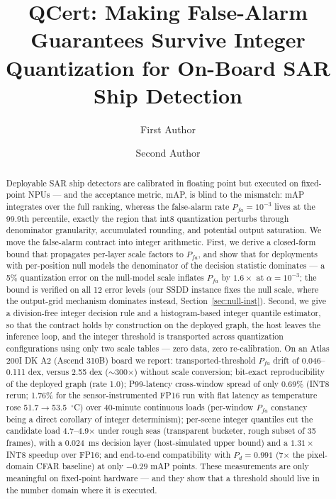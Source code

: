 \documentclass[preprint,12pt]{elsarticle}
\newcommand{\Pfa}{P_{fa}}
\begin{document}
\begin{frontmatter}

\title{QCert: Making False-Alarm Guarantees Survive Integer Quantization for On-Board SAR Ship Detection}

\author[inst1]{First Author}
\author[inst1]{Second Author}

\begin{abstract}
Deployable SAR ship detectors are calibrated in floating point but executed on fixed-point NPUs --- and the acceptance metric, mAP, is blind to the mismatch: mAP integrates over the full ranking, whereas the false-alarm rate $\Pfa=10^{-3}$ lives at the 99.9th percentile, exactly the region that int8 quantization perturbs through denominator granularity, accumulated rounding, and potential output saturation.
We move the false-alarm contract into integer arithmetic.
First, we derive a closed-form bound that propagates per-layer scale factors to $\Pfa$, and show that for deployments with per-position null models the denominator of the decision statistic dominates --- a 5\% quantization error on the null-model scale inflates $\Pfa$ by $1.6\times$ at $\alpha=10^{-3}$; the bound is verified on all 12 error levels (our SSDD instance fixes the null scale, where the output-grid mechanism dominates instead, Section~\ref{sec:null-inst}).
Second, we give a division-free integer decision rule and a histogram-based integer quantile estimator, so that the contract holds by construction on the deployed graph, the host leaves the inference loop, and the integer threshold is transported across quantization configurations using only two scale tables --- zero data, zero re-calibration.
On an Atlas 200I DK A2 (Ascend 310B) board we report: transported-threshold $\Pfa$ drift of 0.046--0.111 dex, versus 2.55 dex ($\sim$300$\times$) without scale conversion; bit-exact reproducibility of the deployed graph (rate 1.0); P99-latency cross-window spread of only 0.69\% (INT8 rerun; 1.76\% for the sensor-instrumented FP16 run with flat latency as temperature rose 51.7$\to$53.5~$^{\circ}$C) over 40-minute continuous loads (per-window $\Pfa$ constancy being a direct corollary of integer determinism); per-scene integer quantiles cut the candidate load 4.7--4.9$\times$ under rough seas (transparent bucketer, rough subset of 35 frames), with a 0.024~ms decision layer (host-simulated upper bound) and a $1.31\times$ INT8 speedup over FP16; and end-to-end compatibility with $P_d=0.991$ (7$\times$ the pixel-domain CFAR baseline) at only $-0.29$ mAP points.
These measurements are only meaningful on fixed-point hardware --- and they show that a threshold should live in the number domain where it is executed.
\end{abstract}


\end{frontmatter}
\end{document}
